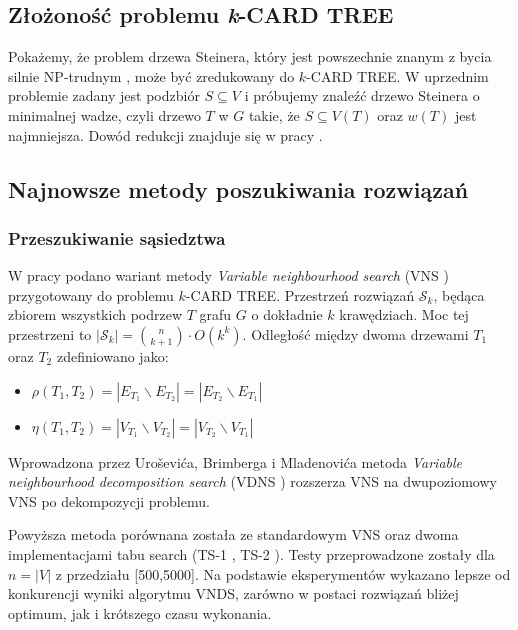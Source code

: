 \documentclass[12pt]{article}
\begin{document}
\subsection{Złożoność problemu \textit{k}-CARD TREE}

Pokażemy, że problem drzewa Steinera, który jest powszechnie znanym z bycia silnie NP-trudnym \cite{steiner}, może być zredukowany do $k$-CARD TREE. W uprzednim problemie zadany jest podzbiór $S \subseteq V$ i próbujemy znaleźć drzewo Steinera o minimalnej wadze, czyli drzewo $T$ w $G$ takie, że $S \subseteq V(T)$ oraz $w(T)$ jest najmniejsza. Dowód redukcji znajduje się w pracy \cite{k_card_trees}.

\subsection{Najnowsze metody poszukiwania rozwiązań}

\subsubsection{Przeszukiwanie sąsiedztwa}

W pracy \cite{neighbourhood} podano wariant metody \textit{Variable neighbourhood search} (VNS \cite{vns}) przygotowany do problemu $k$-CARD TREE. Przestrzeń rozwiązań $\mathcal{S}_k$, będąca zbiorem wszystkich podrzew $T$ grafu $G$ o dokładnie $k$ krawędziach. Moc tej przestrzeni to $|\mathcal{S}_k| = \binom{n}{k+1} \cdot O(k^k)$. Odległość między dwoma drzewami $T_1$ oraz $T_2$ zdefiniowano jako:
\begin{itemize}
  \item $\rho(T_1,T_2) = |E_{T_1} \backslash E_{T_2}| = |E_{T_2} \backslash E_{T_1}|$
  \item $\eta(T_1,T_2) = |V_{T_1} \backslash V_{T_2}| = |V_{T_2} \backslash V_{T_1}|$
\end{itemize}

Wprowadzona przez Uroševića, Brimberga i Mladenovića metoda \textit{Variable neighbourhood decomposition search} (VDNS \cite{vnds}) rozszerza VNS na dwupoziomowy VNS po dekompozycji problemu.

Powyższa metoda porównana została ze standardowym VNS oraz dwoma implementacjami tabu search (TS-1 \cite{ts1}, TS-2 \cite{ts2}). Testy przeprowadzone zostały dla $n=|V|$ z przedziału [500,5000]. Na podstawie eksperymentów wykazano lepsze od konkurencji wyniki algorytmu VNDS, zarówno w postaci rozwiązań bliżej optimum, jak i krótszego czasu wykonania.
\end{document}
